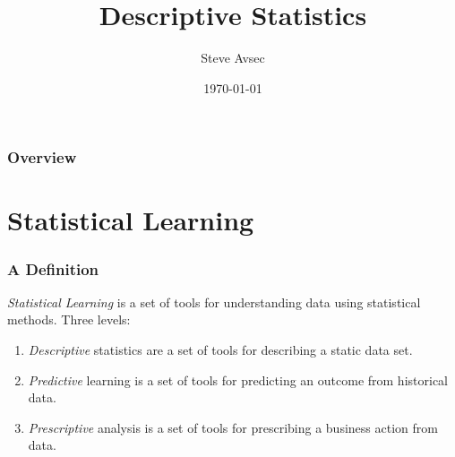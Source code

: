 \documentclass[
	11pt, %
]{beamer}
\title[Descriptive Statistics]{Descriptive Statistics} %
\author[Steve Avsec]{Steve Avsec} %
\institute[IIT]{Illinois Institute of Technology} %
\date[\today]{\today} %
\begin{document}

\begin{frame}
	\titlepage %
\end{frame}



\begin{frame}
	\frametitle{Overview} %
	
	\tableofcontents %
\end{frame}


\section{Statistical Learning}
\begin{frame}
	\frametitle{A Definition}
	\emph{Statistical Learning} is a set of tools for understanding data using statistical methods.
	\pause
	\vfill
	Three levels:
	\begin{enumerate}
		\item \emph{Descriptive} statistics are a set of tools for describing a static data set.
			\pause
		\item \emph{Predictive} learning is a set of tools for predicting an outcome from historical data.
			\pause
		\item \emph{Prescriptive} analysis is a set of tools for prescribing a business action from data.
	\end{enumerate}
	\vfill
\end{frame}
\end{document}
